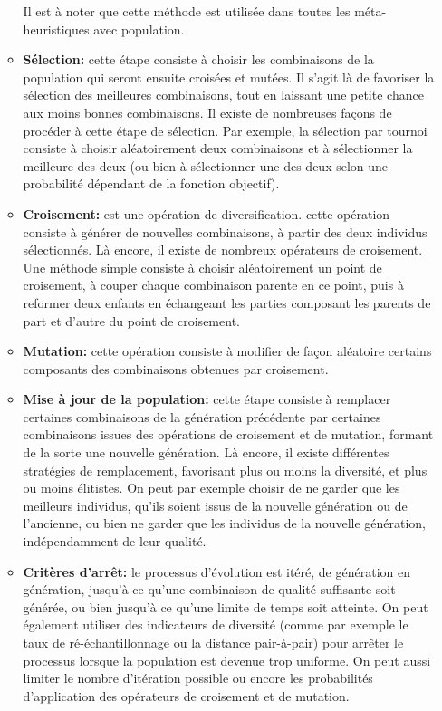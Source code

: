 \begin{enumerate}[label=\alph*)]
\begin{itemize}
Il est à noter que cette méthode est utilisée dans toutes les méta-heuristiques avec population.

	\item \textbf{Sélection: } cette étape consiste à choisir les combinaisons de la population qui seront ensuite croisées et mutées. Il s’agit là de favoriser la sélection des meilleures combinaisons, tout en laissant une petite chance aux moins bonnes combinaisons. Il existe de nombreuses façons de procéder à cette étape de sélection. Par exemple, la sélection par tournoi consiste à choisir aléatoirement deux combinaisons et à sélectionner la meilleure des deux (ou bien à sélectionner une des deux selon une probabilité dépendant de la fonction objectif).
	
	\item \textbf{Croisement:} est une opération de diversification. cette opération consiste à générer de nouvelles combinaisons, à partir des deux individus sélectionnés. Là encore, il existe de nombreux opérateurs de croisement. Une méthode simple consiste à choisir aléatoirement un point de croisement, à couper chaque combinaison parente en ce point, puis à reformer deux enfants en échangeant les parties composant les parents de part et d’autre du point de croisement.
	
	\item \textbf{Mutation: } cette opération consiste à modifier de façon aléatoire certains composants des combinaisons obtenues par croisement.
	
	\item \textbf{Mise à jour de la population: } cette étape consiste à remplacer certaines combinaisons de la génération précédente par certaines combinaisons issues des opérations de croisement et de mutation, formant de la sorte une nouvelle génération. Là encore, il existe différentes stratégies de remplacement, favorisant plus ou moins la diversité, et plus ou moins élitistes. On peut par exemple choisir de ne garder que les meilleurs individus, qu’ils soient issus de la nouvelle génération ou de l’ancienne, ou bien ne garder que les individus de la nouvelle génération, indépendamment de leur qualité.
	
	\item \textbf{Critères d’arrêt: } le processus d’évolution est itéré, de génération en génération, jusqu’à ce qu’une combinaison de qualité suffisante soit générée, ou bien jusqu’à ce qu’une limite de temps soit atteinte. On peut également utiliser des indicateurs de diversité (comme par exemple le taux de ré-échantillonnage ou la distance pair-à-pair) pour arrêter le processus lorsque la population est devenue trop uniforme. On peut aussi limiter le nombre d’itération possible ou encore les probabilités d’application des opérateurs de croisement et de 
mutation.
 

\end{itemize}
\end{enumerate}
